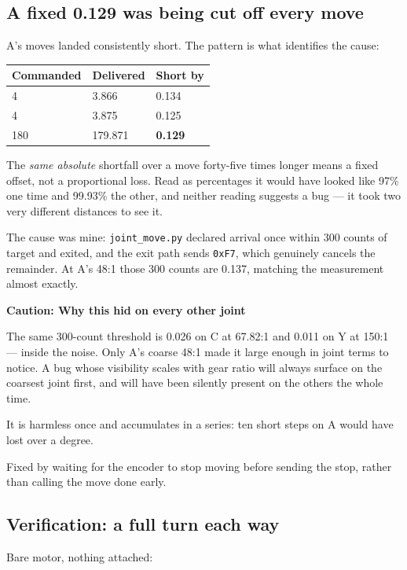 \documentclass[11pt,letterpaper]{article}
\newenvironment{caution}[1]{%
    \par\addvspace{8pt}%
    \noindent{\color{cautionred}\rule{\linewidth}{0.8pt}}\par\vspace{2pt}
    \noindent\textbf{\color{cautionred}Caution: #1}\par\vspace{2pt}
}{%
    \par\vspace{2pt}\noindent{\color{cautionred}\rule{\linewidth}{0.4pt}}%
    \par\addvspace{8pt}%
}
\begin{document}
\subsection{A fixed 0.129\textdegree{} was being cut off every move}
A's moves landed consistently short. The pattern is what identifies the cause:

\begin{center}
\begin{tabular}{lll}
\toprule
\textbf{Commanded} & \textbf{Delivered} & \textbf{Short by} \\ \midrule
4\textdegree{}   & 3.866\textdegree{}   & 0.134\textdegree{} \\
4\textdegree{}   & 3.875\textdegree{}   & 0.125\textdegree{} \\
180\textdegree{} & 179.871\textdegree{} & \textbf{0.129\textdegree{}} \\
\bottomrule
\end{tabular}
\end{center}

The \emph{same absolute} shortfall over a move forty-five times longer means a
fixed offset, not a proportional loss. Read as percentages it would have looked
like 97\% one time and 99.93\% the other, and neither reading suggests a bug ---
it took two very different distances to see it.

The cause was mine: \texttt{joint\_move.py} declared arrival once within 300
counts of target and exited, and the exit path sends \texttt{0xF7}, which
genuinely cancels the remainder. At A's 48:1 those 300 counts are
0.137\textdegree{}, matching the measurement almost exactly.

\begin{caution}{Why this hid on every other joint}
The same 300-count threshold is 0.026\textdegree{} on C at 67.82:1 and
0.011\textdegree{} on Y at 150:1 --- inside the noise. Only A's coarse 48:1 made
it large enough in joint terms to notice. A bug whose visibility scales with gear
ratio will always surface on the coarsest joint first, and will have been
silently present on the others the whole time.

It is harmless once and accumulates in a series: ten short steps on A would have
lost over a degree.
\end{caution}

Fixed by waiting for the encoder to stop moving before sending the stop, rather
than calling the move done early.

\subsection{Verification: a full turn each way}
Bare motor, nothing attached:
\end{document}
